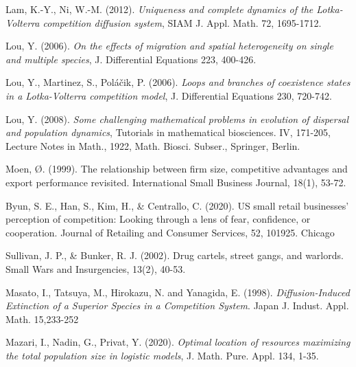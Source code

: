 \documentclass[10pt]{amsart}
\theoremstyle{definition}
\begin{document}
\begin{thebibliography}{}
  
  
   
%   
 Lam, K.-Y., Ni, W.-M. (2012).
\newblock\emph{Uniqueness and complete dynamics of the Lotka-Volterra competition diffusion system}, 
\newblock SIAM J. Appl. Math. 72, 1695-1712.   
   

 Lou, Y. (2006).
\newblock\emph{On the effects of migration and spatial heterogeneity on single and multiple species}, 
\newblock J. Differential Equations 223, 400-426.    
 
 Lou, Y., Martinez, S., Pol\'{a}\v{c}ik, P. (2006).
\newblock\emph{Loops and branches of coexistence states in a Lotka-Volterra competition model}, 
\newblock J. Differential Equations 230, 720-742.
 
 Lou, Y. (2008).
 \newblock\emph{Some challenging mathematical problems in evolution of dispersal and population dynamics}, 
 \newblock Tutorials in mathematical biosciences. IV, 171-205, Lecture Notes in Math., 1922, Math. Biosci. Subser., Springer, Berlin.
 
Moen, Ø. (1999). The relationship between firm size, competitive advantages and export performance revisited. International Small Business Journal, 18(1), 53-72. 

Byun, S. E., Han, S., Kim, H., \& Centrallo, C. (2020). US small retail businesses’ perception of competition: Looking through a lens of fear, confidence, or cooperation. Journal of Retailing and Consumer Services, 52, 101925.
Chicago	

 Sullivan, J. P., \& Bunker, R. J. (2002). Drug cartels, street gangs, and warlords. Small Wars and Insurgencies, 13(2), 40-53.
 
  Masato, I., Tatsuya, M., Hirokazu, N. and Yanagida, E. (1998).
 \newblock\emph{ Diffusion-Induced Extinction of a Superior Species in a Competition System}.
 \newblock Japan J. Indust. Appl. Math. 15,233-252
 
  Mazari, I., Nadin, G., Privat, Y. (2020).
\newblock\emph{Optimal location of resources maximizing the total population size in
logistic models},
\newblock J. Math. Pure. Appl. 134, 1-35.
 

\end{thebibliography}
\end{document}
